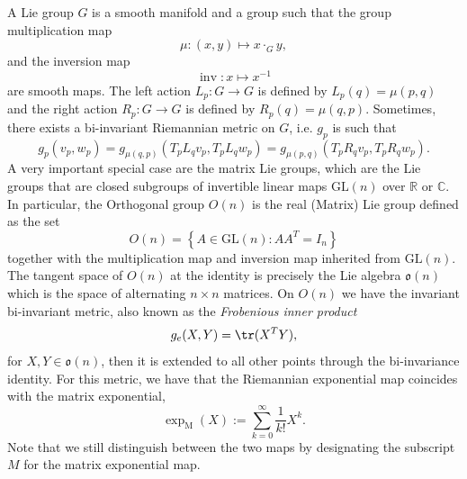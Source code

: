 \documentclass[12pt,a4paper]{article}
\theoremstyle{definition}
\theoremstyle{remark}
\DeclareMathOperator{\inv}{inv}
\begin{document}
A Lie group $G$ is a smooth manifold and a group such that the group multiplication map
\[
\mu:(x,y) \longmapsto x\cdot_G y,
\]
and the inversion map
\[
\inv : x\longmapsto x^{-1}
\]
are smooth maps. The left action $L_p:G\rightarrow G$ is defined by $L_p(q)=\mu(p,q)$ and the right action $R_p:G \rightarrow G$ is defined by $R_p(q)=\mu(q,p)$. Sometimes, there exists a bi-invariant Riemannian metric on $G$, i.e. $g_p$ is such that
\[
g_{p}(v_p,w_p)=g_{\mu(q,p)}(T_p L_q v_p,T_pL_q w_p)=g_{\mu(p,q)}(T_p R_q v_p,T_pR_q w_p).
\]
A very important special case are the matrix Lie groups, which are the Lie groups that are closed subgroups of invertible linear maps $\mathrm{GL}(n)$ over $\mathbb{R}$ or $\mathbb{C}$. In particular, the Orthogonal group $O(n)$ is the real (Matrix) Lie group defined as the set
\[
O(n)=\left\{ A\in \mathrm{GL}(n): AA^{T}= I_n \right\}
\]
together with the multiplication map and inversion map inherited from $\mathrm{GL}(n)$. The tangent space of $O(n)$ at the identity is precisely the Lie algebra $\mathfrak{o}(n)$ which is the space of alternating $n\times n$ matrices. On $O(n)$ we have the invariant bi-invariant metric, also known as the \textit{Frobenious inner product}
\[
g_{e}(X,Y) = \tr (X^T Y),
\]
for $X,Y\in \mathfrak{o}(n)$, then it is extended to all other points through the bi-invariance identity. For this metric, we have that the Riemannian exponential map coincides with the matrix exponential,
\[
\exp_{\mathrm{M}}(X) := \sum_{k=0}^\infty \frac{1}{k!} X^k.
\]
Note that we still distinguish between the two maps by designating the subscript $M$ for the matrix exponential map. 
\end{document}
